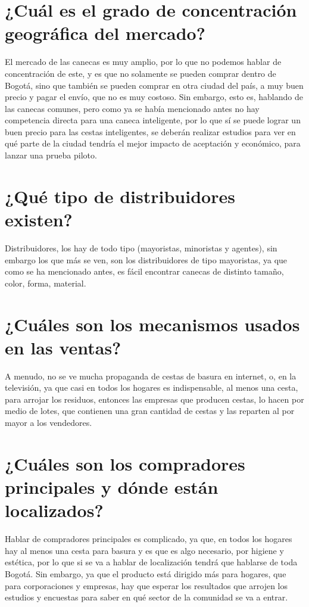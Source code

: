 \documentclass{report}
\begin{document}
    \section{¿Cuál es el grado de concentración geográfica del mercado?}
    El mercado de las canecas es muy amplio, por lo que no podemos hablar de concentración de este, y es que no solamente se pueden comprar dentro de Bogotá, sino que también se pueden comprar en otra ciudad del país, a muy buen precio y pagar el envío, que no es muy costoso. Sin embargo, esto es, hablando de las canecas comunes, pero como ya se había mencionado antes no hay competencia directa para una caneca inteligente, por lo que sí se puede lograr un buen precio para las cestas inteligentes, se deberán realizar estudios para ver en qué parte de la ciudad tendría el mejor impacto de aceptación y económico, para lanzar una prueba piloto.
    
    \section{¿Qué tipo de distribuidores existen?}
    Distribuidores, los hay de todo tipo (mayoristas, minoristas y agentes), sin embargo los que más se ven, son los distribuidores de tipo mayoristas, ya que como se ha mencionado antes, es fácil encontrar canecas de distinto tamaño, color, forma, material.
    
    \section{¿Cuáles son los mecanismos usados en las ventas?}
    A menudo, no se ve mucha propaganda de cestas de basura en internet, o, en la televisión, ya que casi en todos los hogares es indispensable, al menos una cesta, para arrojar los residuos, entonces las empresas que producen cestas, lo hacen por medio de lotes, que contienen una gran cantidad de cestas y las reparten al por mayor a los vendedores.
    
    \section{¿Cuáles son los compradores principales y dónde están localizados?}
    Hablar de compradores principales es complicado, ya que, en todos los hogares hay al menos una cesta para basura y es que es algo necesario, por higiene y estética, por lo que si se va a hablar de localización tendrá que hablarse de toda Bogotá. Sin embargo, ya que el producto está dirigido más para hogares, que para corporaciones y empresas, hay que esperar los resultados que arrojen los estudios y encuestas para saber en qué sector de la comunidad se va a entrar.
\end{document}

